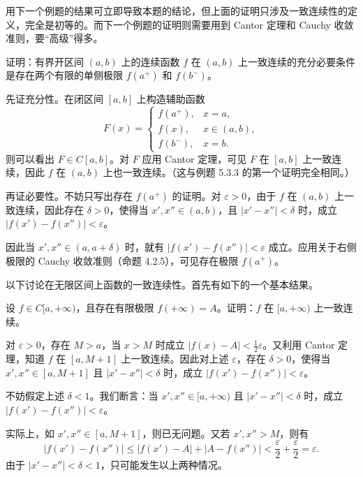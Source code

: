 \begin{xremark}
用下一个例题的结果可立即导致本题的结论，但上面的证明只涉及一致连续性的定义，完全是初等的。而下一个例题的证明则需要用到 Cantor 定理和 Cauchy 收敛准则，要“高级”得多。
\end{xremark}

\begin{xexample}[5.4.5]
证明：有界开区间 $(a,b)$ 上的连续函数 $f$ 在 $(a,b)$ 上一致连续的充分必要条件是存在两个有限的单侧极限 $f(a^+)$ 和 $f(b^-)$。
\end{xexample}
\begin{xproof}
先证充分性。在闭区间 $[a,b]$ 上构造辅助函数
\[
  F(x)=\begin{cases}
    f(a^+),&x=a,\\
    f(x),&x\in(a,b),\\
    f(b^-),&x=b.
  \end{cases}
\]
则可以看出 $F\in C[a,b]$。对 $F$ 应用 Cantor 定理，可见 $F$ 在 $[a,b]$ 上一致连续，因此 $f$ 在 $(a,b)$ 上也一致连续。（这与例题 5.3.3 的第一个证明完全相同。）

再证必要性。不妨只写出存在 $f(a^+)$ 的证明。对 $\varepsilon>0$，由于 $f$ 在 $(a,b)$ 上一致连续，因此存在 $\delta>0$，使得当 $x',x''\in(a,b)$，且 $|x'-x''|<\delta$ 时，成立 $|f(x')-f(x'')|<\varepsilon$。

因此当 $x',x''\in(a,a+\delta)$ 时，就有 $|f(x')-f(x'')|<\varepsilon$ 成立。应用关于右侧极限的 Cauchy 收敛准则（命题 4.2.5），可见存在极限 $f(a^+)$。
\end{xproof}

以下讨论在无限区间上函数的一致连续性。首先有如下的一个基本结果。

\begin{xexample}[5.4.6]
设 $f\in C[a,+\infty)$，且存在有限极限 $f(+\infty)=A$。证明：$f$ 在 $[a,+\infty)$ 上一致连续。
\end{xexample}
\begin{xproof}
对 $\varepsilon>0$，存在 $M>a$，当 $x>M$ 时成立 $|f(x)-A|<\frac12\varepsilon$。又利用 Cantor 定理，知道 $f$ 在 $[a,M+1]$ 上一致连续。因此对上述 $\varepsilon$，存在 $\delta>0$，使得当 $x',x''\in[a,M+1]$ 且 $|x'-x''|<\delta$ 时，成立 $|f(x')-f(x'')|<\varepsilon$。

不妨假定上述 $\delta<1$。我们断言：当 $x',x''\in[a,+\infty)$ 且 $|x'-x''|<\delta$ 时，成立 $|f(x')-f(x'')|<\varepsilon$。

实际上，如 $x',x''\in[a,M+1]$，则已无问题。又若 $x',x''>M$，则有
\[
  |f(x')-f(x'')|\le|f(x')-A|+|A-f(x'')|<\frac\varepsilon2+\frac\varepsilon2=\varepsilon.
\]
由于 $|x'-x''|<\delta<1$，只可能发生以上两种情况。
\end{xproof}

